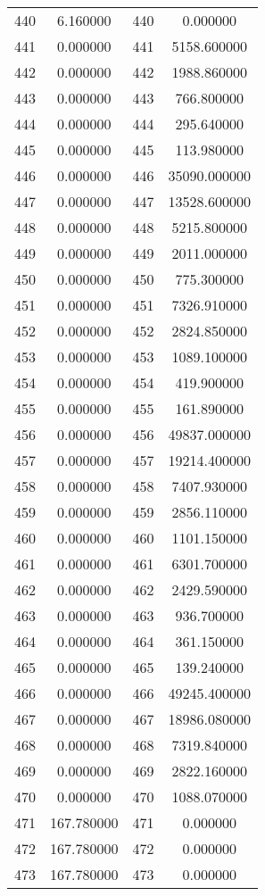 \documentclass[12pt]{article}
\begin{document}
\begin{longtable}{@{}cccc@{}}
440 & 6.160000 & 440 & 0.000000 \\
441 & 0.000000 & 441 & 5158.600000 \\
442 & 0.000000 & 442 & 1988.860000 \\
443 & 0.000000 & 443 & 766.800000 \\
444 & 0.000000 & 444 & 295.640000 \\
445 & 0.000000 & 445 & 113.980000 \\
446 & 0.000000 & 446 & 35090.000000 \\
447 & 0.000000 & 447 & 13528.600000 \\
448 & 0.000000 & 448 & 5215.800000 \\
449 & 0.000000 & 449 & 2011.000000 \\
450 & 0.000000 & 450 & 775.300000 \\
451 & 0.000000 & 451 & 7326.910000 \\
452 & 0.000000 & 452 & 2824.850000 \\
453 & 0.000000 & 453 & 1089.100000 \\
454 & 0.000000 & 454 & 419.900000 \\
455 & 0.000000 & 455 & 161.890000 \\
456 & 0.000000 & 456 & 49837.000000 \\
457 & 0.000000 & 457 & 19214.400000 \\
458 & 0.000000 & 458 & 7407.930000 \\
459 & 0.000000 & 459 & 2856.110000 \\
460 & 0.000000 & 460 & 1101.150000 \\
461 & 0.000000 & 461 & 6301.700000 \\
462 & 0.000000 & 462 & 2429.590000 \\
463 & 0.000000 & 463 & 936.700000 \\
464 & 0.000000 & 464 & 361.150000 \\
465 & 0.000000 & 465 & 139.240000 \\
466 & 0.000000 & 466 & 49245.400000 \\
467 & 0.000000 & 467 & 18986.080000 \\
468 & 0.000000 & 468 & 7319.840000 \\
469 & 0.000000 & 469 & 2822.160000 \\
470 & 0.000000 & 470 & 1088.070000 \\
471 & 167.780000 & 471 & 0.000000 \\
472 & 167.780000 & 472 & 0.000000 \\
473 & 167.780000 & 473 & 0.000000 \\

\end{longtable}
\end{document}

